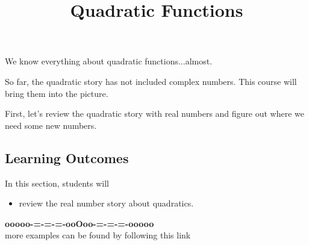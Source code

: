 \documentclass{ximera}
\title{Quadratic Functions}
\begin{document}
\begin{abstract}
\end{abstract}
\maketitle



We know everything about quadratic functions...almost. 

So far, the quadratic story has not included complex numbers.  This course will bring them into the picture. 



First, let's review the quadratic story with real numbers and figure out where we need some new numbers.













\subsection*{Learning Outcomes}

\begin{sectionOutcomes}
In this section, students will 

\begin{itemize}
\item review the real number story about quadratics.
\end{itemize}
\end{sectionOutcomes}










\begin{center}
\textbf{\textcolor{green!50!black}{ooooo-=-=-=-ooOoo-=-=-=-ooooo}} \\

more examples can be found by following this link\\ 

\end{center}
\end{document}
